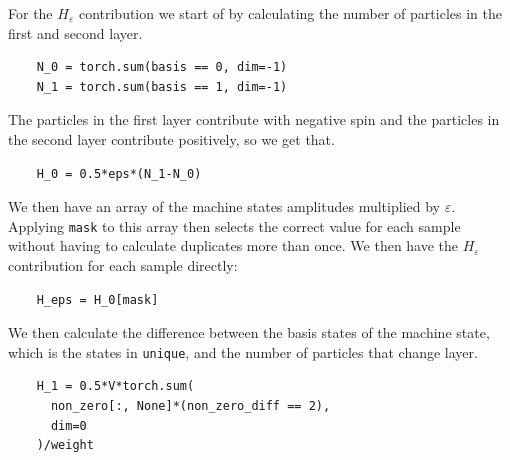 For the $H_{\varepsilon}$ contribution we start of by calculating the number of particles in the first and second layer.

\begin{verbatim}
    N_0 = torch.sum(basis == 0, dim=-1)
    N_1 = torch.sum(basis == 1, dim=-1)
\end{verbatim}

The particles in the first layer contribute with negative spin and the particles in the second layer contribute positively, so we get that.

\begin{verbatim}
    H_0 = 0.5*eps*(N_1-N_0)
\end{verbatim}

We then have an array of the machine states amplitudes multiplied by $\varepsilon$. Applying \texttt{mask} to this array then selects the correct value for each sample without having to calculate duplicates more than once. We then have the $H_{\varepsilon}$ contribution for each sample directly:

\begin{verbatim}
    H_eps = H_0[mask]
\end{verbatim}

We then calculate the difference between the basis states of the machine state, which is the states in \texttt{unique}, and the number of particles that change layer.

\begin{verbatim}
    H_1 = 0.5*V*torch.sum(
      non_zero[:, None]*(non_zero_diff == 2), 
      dim=0
    )/weight
\end{verbatim}

